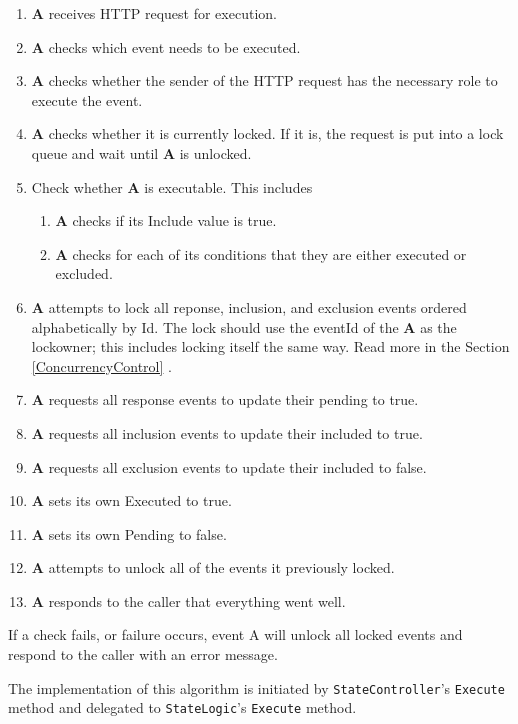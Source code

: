 \begin{enumerate}
\item \textbf{A} receives HTTP request for execution.
\item \textbf{A} checks which event needs to be executed.
\item \textbf{A} checks whether the sender of the HTTP request has the necessary role to execute the event. 
\item \textbf{A} checks whether it is currently locked. If it is, the request is put into a lock queue and wait until \textbf{A} is unlocked.
\item Check whether \textbf{A} is executable. This includes
	\begin{enumerate}
	\item \textbf{A} checks if its Include value is true.
	\item \textbf{A} checks for each of its conditions that they are either executed or excluded.
	\end{enumerate}
\item \textbf{A} attempts to lock all reponse, inclusion, and exclusion events ordered alphabetically by Id. The lock should use the eventId of the \textbf{A} as the lockowner; this includes locking itself the same way. Read more in the Section \ref{ConcurrencyControl} .
\item \textbf{A} requests all response events to update their pending to true.
\item \textbf{A} requests all inclusion events to update their included to true.
\item \textbf{A} requests all exclusion events to update their included to false.
\item \textbf{A} sets its own Executed to true.
\item \textbf{A} sets its own Pending to false.
\item \textbf{A} attempts to unlock all of the events it previously locked.
\item \textbf{A} responds to the caller that everything went well.
\end{enumerate}

If a check fails, or failure occurs, event A will unlock all locked events and respond to the caller with an error message.

The implementation of this algorithm is initiated by \texttt{StateController}'s \texttt{Execute} method and delegated to \texttt{StateLogic}'s \texttt{Execute} method. 